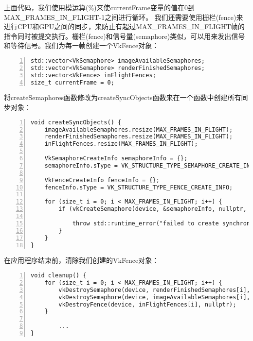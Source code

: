 \documentclass{ctexart}
\begin{document}
上面代码，我们使用模运算(\%)来使currentFrame变量的值在0到MAX\_FRAMES\_IN\_FLIGHT-1之间进行循环。
我们还需要使用栅栏(fence)来进行CPU和GPU之间的同步，来防止有超过MAX\_FRAMES\_IN\_FLIGHT帧的指令同时被提交执行。栅栏(fence)和信号量(semaphore)类似，可以用来发出信号和等待信号。我们为每一帧创建一个VkFence对象：

\begin{lstlisting}[language={[ANSI]C},keywordstyle=\color{blue!70},commentstyle=\color{red!50!green!50!blue!50},frame=shadowbox, rulesepcolor=\color{red!20!green!20!blue!20},basicstyle=\small,numbers=left, numberstyle=\tiny,breaklines=true]
std::vector<VkSemaphore> imageAvailableSemaphores;
std::vector<VkSemaphore> renderFinishedSemaphores;
std::vector<VkFence> inFlightFences;
size_t currentFrame = 0;
\end{lstlisting}

将createSemaphores函数修改为createSyncObjects函数来在一个函数中创建所有同步对象：

\begin{lstlisting}[language={[ANSI]C},keywordstyle=\color{blue!70},commentstyle=\color{red!50!green!50!blue!50},frame=shadowbox, rulesepcolor=\color{red!20!green!20!blue!20},basicstyle=\small,numbers=left, numberstyle=\tiny,breaklines=true]
void createSyncObjects() {
	imageAvailableSemaphores.resize(MAX_FRAMES_IN_FLIGHT);
	renderFinishedSemaphores.resize(MAX_FRAMES_IN_FLIGHT);
	inFlightFences.resize(MAX_FRAMES_IN_FLIGHT);

	VkSemaphoreCreateInfo semaphoreInfo = {};
	semaphoreInfo.sType = VK_STRUCTURE_TYPE_SEMAPHORE_CREATE_INFO;

	VkFenceCreateInfo fenceInfo = {};
	fenceInfo.sType = VK_STRUCTURE_TYPE_FENCE_CREATE_INFO;

	for (size_t i = 0; i < MAX_FRAMES_IN_FLIGHT; i++) {
		if (vkCreateSemaphore(device, &semaphoreInfo, nullptr, &imageAvailableSemaphores[i]) != VK_SUCCESS || vkCreateSemaphore(device, &semaphoreInfo, nullptr, &renderFinishedSemaphores[i]) != VK_SUCCESS || vkCreateFence(device, &fenceInfo, nullptr, &inFlightFences[i]) != VK_SUCCESS) {

			throw std::runtime_error("failed to create synchronization objects for a frame!");
		}
	}
}
\end{lstlisting}

在应用程序结束前，清除我们创建的VkFence对象：

\begin{lstlisting}[language={[ANSI]C},keywordstyle=\color{blue!70},commentstyle=\color{red!50!green!50!blue!50},frame=shadowbox, rulesepcolor=\color{red!20!green!20!blue!20},basicstyle=\small,numbers=left, numberstyle=\tiny,breaklines=true]
void cleanup() {
	for (size_t i = 0; i < MAX_FRAMES_IN_FLIGHT; i++) {
		vkDestroySemaphore(device, renderFinishedSemaphores[i], nullptr);
		vkDestroySemaphore(device, imageAvailableSemaphores[i], nullptr);
		vkDestroyFence(device, inFlightFences[i], nullptr);
	}

		...
}
\end{lstlisting}
\end{document}
